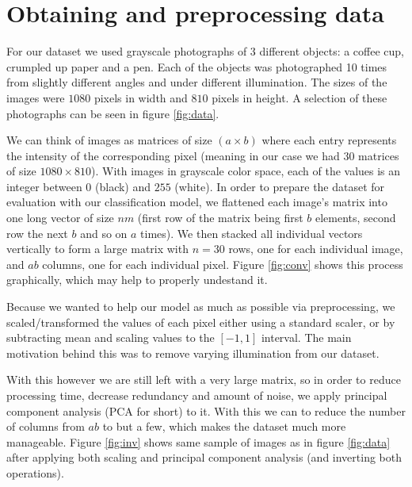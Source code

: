 \documentclass{article}
\newcommand{\enterProblemHeader}[1]{
}
\newcommand{\exitProblemHeader}[1]{
}
\newcounter{homeworkProblemCounter} %
\newcommand{\homeworkProblemName}{}
\newenvironment{homeworkProblem}[1][Problem \arabic{homeworkProblemCounter}]{ %
\stepcounter{homeworkProblemCounter} %
\renewcommand{\homeworkProblemName}{#1} %
\section{\homeworkProblemName} %
\enterProblemHeader{\homeworkProblemName} %
}{
\exitProblemHeader{\homeworkProblemName} %
}
\begin{document}
\begin{homeworkProblem}[Obtaining and preprocessing data]
For our dataset we used grayscale photographs of 3 different objects: a coffee cup, crumpled up paper and a pen. Each of the objects was photographed 10 times from slightly different angles and under different illumination. The sizes of the images were $1080$ pixels in width and $810$ pixels in height. A selection of these photographs can be seen in figure \ref{fig:data}.

We can think of images as matrices of size $(a \times b)$ where each entry represents the intensity of the corresponding pixel (meaning in our case we had $30$ matrices of size $1080 \times 810$). With images in grayscale color space, each of the values is an integer between $0$ (black) and $255$ (white). In order to prepare the dataset for evaluation with our classification model, we flattened each image's matrix into one long vector of size $n m$ (first row of the matrix being first $b$ elements, second row the next $b$ and so on $a$ times). We then stacked all individual vectors vertically to form a large matrix with $n = 30$ rows, one for each individual image, and $a b$ columns, one for each individual pixel. Figure \ref{fig:conv} shows this process graphically, which may help to properly undestand it.

  Because we wanted to help our model as much as possible via preprocessing, we scaled/transformed the values of each pixel either using a standard scaler, or by subtracting mean and scaling values to the $[-1, 1]$ interval. The main motivation behind this was to remove varying illumination from our dataset.

  With this however we are still left with a very large matrix, so in order to reduce processing time, decrease redundancy and amount of noise, we apply principal component analysis (PCA for short) to it. With this we can to reduce the number of columns from $a b$ to but a few, which makes the dataset much more manageable. Figure \ref{fig:inv} shows same sample of images as in figure \ref{fig:data} after applying both scaling and principal component analysis (and inverting both operations).
\end{homeworkProblem}

\end{document}
